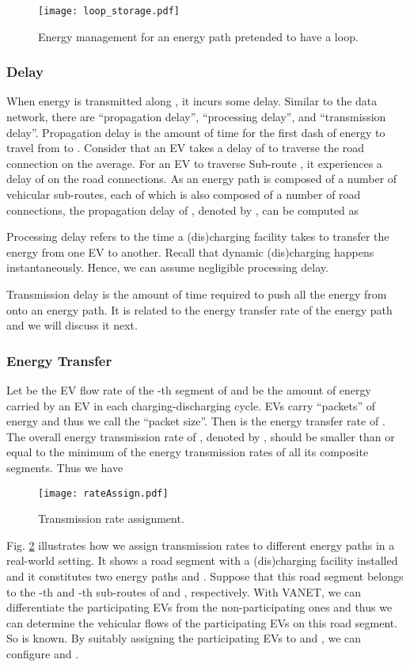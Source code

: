 \documentclass[journal]{IEEEtran}
\begin{document}
\begin{figure}[!t]
\centering
\texttt{[image: loop\_storage.pdf]}
\caption{Energy management for an energy path pretended to have a loop.}
\label{fig:loop_storage}
\end{figure}


\subsubsection{Delay}
When energy is transmitted along , it incurs some delay. Similar to the data network, there are ``propagation delay'', ``processing delay'', and ``transmission delay''. Propagation delay is the amount of time for the first dash of energy to travel from  to . Consider that an EV takes a delay of  to traverse the road connection  on the average. For an EV to traverse Sub-route , it experiences a delay of  on the road connections. As an energy path is composed of a number of vehicular sub-routes, each of which is also composed of a number of road connections, the propagation delay of , denoted by , can be computed as 


Processing delay refers to the time a (dis)charging facility takes to transfer the energy from one EV to another. Recall that dynamic (dis)charging happens instantaneously. Hence, we can assume negligible processing delay.

Transmission delay is the amount of time required to push all the energy from  onto an energy path. It is related to the energy transfer rate of the energy path and we will discuss it next.

\subsubsection{Energy Transfer}
Let  be the EV flow rate of the -th segment of  and  be the amount of energy carried by an EV in each charging-discharging cycle. EVs carry ``packets'' of energy and thus we call  the ``packet size''. Then  is the energy transfer rate of . The overall energy transmission rate of , denoted by , should be smaller than or equal to the minimum of the energy transmission rates of all its composite segments. Thus we have

\begin{figure}[!t]
\texttt{[image: rateAssign.pdf]}
\caption{Transmission rate assignment.}
\label{fig:rateAssign}
\end{figure}
Fig. \ref{fig:rateAssign} illustrates how we assign transmission rates to different energy paths in a real-world setting. It shows a road segment with a (dis)charging facility installed and it constitutes two energy paths  and . Suppose that this road segment belongs to the -th and -th sub-routes of  and , respectively. With VANET, we can differentiate the participating EVs from the non-participating ones and thus we can determine the vehicular flows of the participating EVs on this road segment. So  is known. By suitably assigning the participating EVs to  and , we can configure  and .
\end{document}
